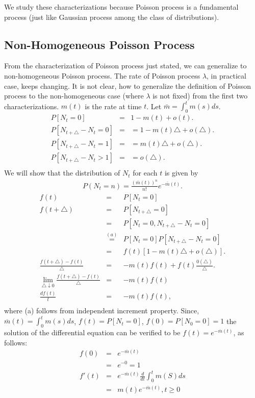 \documentclass[11 pt]{article}
\theoremstyle{plain}
\theoremstyle{definition}
\theoremstyle{remark}
\begin{document}
We study these characterizations because Poisson process is a fundamental process (just like Gaussian process among the class of distributions).

\subsection{Non-Homogeneous Poisson Process}
 From the characterization of Poisson process just stated, we can generalize to non-homogeneous Poisson process. The rate of Poisson process $\lambda$, in practical case, keeps changing. It is not clear, how to generalize the definition of Poisson process to the non-homogeneous case (where $\lambda$ is not fixed) from the first two characterizations. $m(t)$ is the rate at time $t$. Let $\bar{m}=\int_{0}^{t}m(s)ds$. 
 \begin{eqnarray*}
 P[N_{t}=0]&=&1-m(t)+o(t). \\
  P[N_{t+\triangle}-N_t=0] &=& =1-m(t)\triangle+o(\triangle). \\
   P[N_{t+\triangle}-N_t=1] &=& = m(t)\triangle+o(\triangle). \\
   P[N_{t+\triangle}-N_t>1] &=& =  o(\triangle). \\
   \end{eqnarray*}
 We will show that the distribution of $N_t$ for each $t$ is given by
 \begin{eqnarray*}
 P(N_t=n)=\frac{(\bar{m}(t))^n}{n!}e^{-\bar{m}(t)}.
 \end{eqnarray*}
\begin{eqnarray*}
  f(t) &=& P[N_{t}=0] \\
  f(t+\triangle) &=& P[N_{t+\triangle}=0] \\
   &=&  P[N_{t}=0, N_{t+\triangle}-N_{t}=0]\\
   &\stackrel{(a)}{=}& P[N_{t}=0] P[N_{t+\triangle}-N_{t}=0]\\
   &=& f(t)[1-m(t)\triangle +o(\triangle)].\\
\frac{f(t+\triangle)-f(t)}{\triangle} &=& -m(t) f(t) +f(t) \frac{0(\triangle)}{\triangle}. \\
  \lim_{\triangle\downarrow 0}\frac{f(t+\triangle)-f(t)}{\triangle} &=& -m(t) f(t) \\
 \frac{d f(t)}{t} &=& -m(t) f(t),  \\
 \end{eqnarray*}
 where (a) follows from independent increment property. Since, $\overline{m}(t)=\int ^{t}_{0} m(s) ds $, $f(t)=P[N_{t}=0]$, $ f(0)=P[N_{0}=0] =1$ the solution of the differential equation can be verified to be $f(t)=e^{-\overline{m}(t)}$, as follows: 
 \begin{eqnarray*}
     f(0)&=& e^{-\overline{m}(t)}\\
  &=& e^{-0}=1 \\
  f'(t) &=& e^{-\overline{m}(t)}\frac{d}{dt} \int^{t}_{0}m(S) ds\\
  &=& m(t)e^{-\overline{m}(t)}, t\geqslant 0 \\
  \end{eqnarray*}
  
\end{document}

